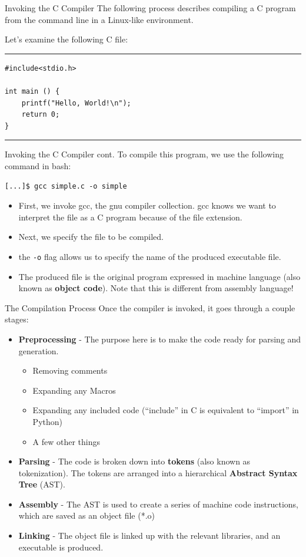 \documentclass[11pt]{beamer}
\begin{document}
\begin{frame}[fragile=singleslide]{Invoking the C Compiler}
The following process describes compiling a C program from the command line in a Linux-like environment.

Let's examine the following C file:
  
\hrule
\begin{verbatim}
#include<stdio.h>

int main () {
    printf("Hello, World!\n");
    return 0;
}
\end{verbatim}
\hrule
\end{frame}

\begin{frame}[fragile=singleslide]{Invoking the C Compiler cont.}
To compile this program, we use the following command in bash:
\begin{verbatim}
[...]$ gcc simple.c -o simple
\end{verbatim}
\begin{itemize}
\item First, we invoke gcc, the gnu compiler collection.  gcc knows we want to interpret the file as a C program because of the file extension.
\item Next, we specify the file to be compiled.  
\item the \texttt{-o} flag allows us to specify the name of the produced executable file.  
\item The produced file is the original program expressed in machine language (also known as \textbf{object code}).  Note that this is different from assembly language!  
\end{itemize}
\end{frame}

\begin{frame}{The Compilation Process}
Once the compiler is invoked, it goes through a couple stages:
\begin{itemize}
\item \textbf{Preprocessing} - The purpose here is to make the code ready for parsing and generation.
\begin{itemize}
\item Removing comments
\item Expanding any Macros
\item Expanding any included code (``include'' in C is equivalent to ``import'' in Python) 
\item A few other things
\end{itemize} 
\item \textbf{Parsing} - The code is broken down into \textbf{tokens} (also known as tokenization).  The tokens are arranged into a hierarchical \textbf{Abstract Syntax Tree} (AST).
\item \textbf{Assembly} - The AST is used to create a series of machine code instructions, which are saved as an object file (*.o)
\item \textbf{Linking} - The object file is linked up with the relevant libraries, and an executable is produced.  
\end{itemize}
\end{frame}
\end{document}
